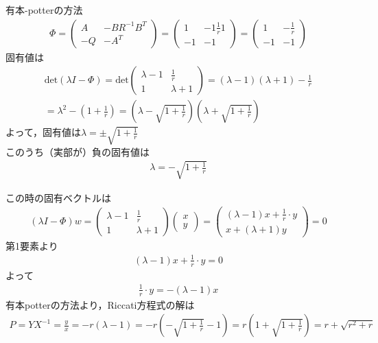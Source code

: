 \documentclass[a4paper,11pt]{jreport}
\begin{document}
有本-potterの方法
\begin{align*}
 \Phi = \left(\begin{array}{cc}
	       A  & - B R^{-1} B^T \\
	       -Q & - A^T
	      \end{array}\right)
      = \left(\begin{array}{cc}
	       1  & - 1\frac{1}{r} 1 \\
	       -1 & -1
	      \end{array}\right)
      = \left(\begin{array}{cc}
	       1  & - \frac{1}{r}  \\
	       -1 & -1
	      \end{array}\right)
\end{align*}
固有値は
\begin{align*}
	\mbox{det}(\lambda I-\Phi) 
	= \mbox{det}
		\left(\begin{array}{cc}
	       \lambda -1  & \frac{1}{r}  \\
	       1 & \lambda +1
	      \end{array}\right)
	= (\lambda -1)(\lambda +1) -\frac{1}{r}
\\
	= \lambda^2-(1+\frac{1}{r})
	=(\lambda-\sqrt{1+\frac{1}{r}})(\lambda+\sqrt{1+\frac{1}{r}})
\end{align*}
よって，固有値は$\lambda = \pm \sqrt{1+\frac{1}{r}}$\\
このうち（実部が）負の固有値は
\begin{align*}
	\lambda = - \sqrt{1+\frac{1}{r}}
\end{align*}

この時の固有ベクトルは
\begin{align*}
	(\lambda I-\Phi)  w
	=	\left(\begin{array}{cc}
	       \lambda -1  &  \frac{1}{r}  \\
	       1 & \lambda +1
	      \end{array}\right)
		\left(\begin{array}{c}
	       x  \\
	       y
	      \end{array}\right)
	=	\left(\begin{array}{c}
	      (\lambda-1)x  + \frac{1}{r}\cdot y  \\
	       x + (\lambda +1)y
	      \end{array}\right)
	= 0
\end{align*}
第1要素より
\begin{align*}
	      (\lambda-1)x  + \frac{1}{r}\cdot y  = 0
\end{align*}
よって
\begin{align*}
	      \frac{1}{r}\cdot y= - (\lambda-1)x  
\end{align*}
有本potterの方法より，Riccati方程式の解は
\begin{align*}
	      P = Y X^{-1} = \frac{y}{x} = -r(\lambda -1) = -r(- \sqrt{1+\frac{1}{r}}-1) = r(1+\sqrt{1+\frac{1}{r}})=r +\sqrt{r^2+r}
\end{align*}
\end{document}
